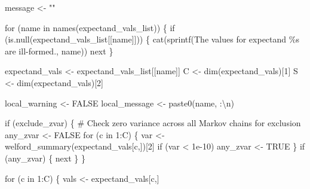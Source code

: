 \documentclass[
  letterpaper,
  DIV=11,
  numbers=noendperiod]{scrartcl}
\newenvironment{Shaded}{\begin{snugshade}}{\end{snugshade}}
\newcommand{\BuiltInTok}[1]{\textcolor[rgb]{0.00,0.23,0.31}{#1}}
\newcommand{\CharTok}[1]{\textcolor[rgb]{0.13,0.47,0.30}{#1}}
\newcommand{\CommentTok}[1]{\textcolor[rgb]{0.37,0.37,0.37}{#1}}
\newcommand{\ControlFlowTok}[1]{\textcolor[rgb]{0.00,0.23,0.31}{#1}}
\newcommand{\DecValTok}[1]{\textcolor[rgb]{0.68,0.00,0.00}{#1}}
\newcommand{\FloatTok}[1]{\textcolor[rgb]{0.68,0.00,0.00}{#1}}
\newcommand{\KeywordTok}[1]{\textcolor[rgb]{0.00,0.23,0.31}{#1}}
\newcommand{\NormalTok}[1]{\textcolor[rgb]{0.00,0.23,0.31}{#1}}
\newcommand{\OperatorTok}[1]{\textcolor[rgb]{0.37,0.37,0.37}{#1}}
\newcommand{\SpecialCharTok}[1]{\textcolor[rgb]{0.37,0.37,0.37}{#1}}
\newcommand{\StringTok}[1]{\textcolor[rgb]{0.13,0.47,0.30}{#1}}
\begin{document}
\begin{Shaded}
\begin{Highlighting}[]
\NormalTok{  message }\OperatorTok{\textless{}{-}} \StringTok{""}

  \ControlFlowTok{for}\NormalTok{ (name }\KeywordTok{in}\NormalTok{ names(expectand\_vals\_list)) \{}
    \ControlFlowTok{if}\NormalTok{ (}\KeywordTok{is}\NormalTok{.null(expectand\_vals\_list[[name]])) \{}
\NormalTok{      cat(sprintf(}\StringTok{\textquotesingle{}The values for expectand \textasciigrave{}}\SpecialCharTok{\%s}\StringTok{\textasciigrave{} are ill{-}formed.\textquotesingle{}}\NormalTok{,}
\NormalTok{          name))}
      \BuiltInTok{next}
\NormalTok{    \}}
    
\NormalTok{    expectand\_vals }\OperatorTok{\textless{}{-}}\NormalTok{ expectand\_vals\_list[[name]]}
\NormalTok{    C }\OperatorTok{\textless{}{-}}\NormalTok{ dim(expectand\_vals)[}\DecValTok{1}\NormalTok{]}
\NormalTok{    S }\OperatorTok{\textless{}{-}}\NormalTok{ dim(expectand\_vals)[}\DecValTok{2}\NormalTok{]}
    
\NormalTok{    local\_warning }\OperatorTok{\textless{}{-}}\NormalTok{ FALSE}
\NormalTok{    local\_message }\OperatorTok{\textless{}{-}}\NormalTok{ paste0(name, }\StringTok{\textquotesingle{}:}\CharTok{\textbackslash{}n}\StringTok{\textquotesingle{}}\NormalTok{)}
  
    \ControlFlowTok{if}\NormalTok{ (exclude\_zvar) \{}
      \CommentTok{\# Check zero variance across all Markov chains for exclusion}
\NormalTok{      any\_zvar }\OperatorTok{\textless{}{-}}\NormalTok{ FALSE}
      \ControlFlowTok{for}\NormalTok{ (c }\KeywordTok{in} \DecValTok{1}\NormalTok{:C) \{}
\NormalTok{        var }\OperatorTok{\textless{}{-}}\NormalTok{ welford\_summary(expectand\_vals[c,])[}\DecValTok{2}\NormalTok{]}
        \ControlFlowTok{if}\NormalTok{ (var }\OperatorTok{\textless{}} \FloatTok{1e{-}10}\NormalTok{)}
\NormalTok{          any\_zvar }\OperatorTok{\textless{}{-}}\NormalTok{ TRUE}
\NormalTok{      \}}
      \ControlFlowTok{if}\NormalTok{ (any\_zvar) \{}
        \BuiltInTok{next}
\NormalTok{      \}}
\NormalTok{    \}}
  
    \ControlFlowTok{for}\NormalTok{ (c }\KeywordTok{in} \DecValTok{1}\NormalTok{:C) \{}
\NormalTok{      vals }\OperatorTok{\textless{}{-}}\NormalTok{ expectand\_vals[c,]}
      

\end{Highlighting}
\end{Shaded}
\end{document}
